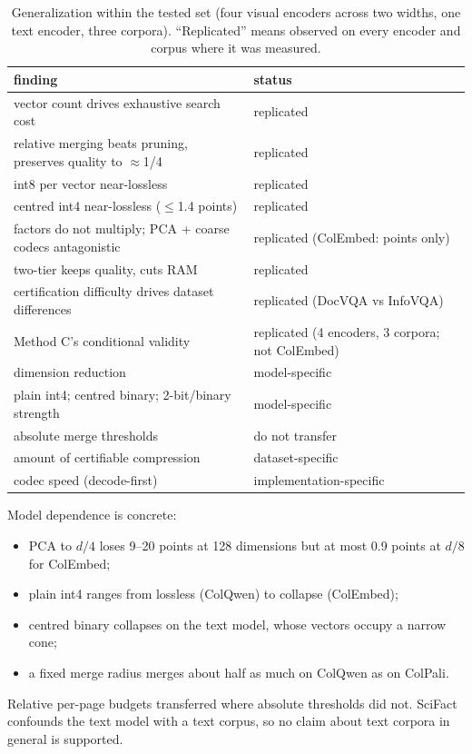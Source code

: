 \documentclass[conference]{IEEEtran}
\begin{document}
\begin{table}[t]
\centering
\caption{Generalization within the tested set (four visual encoders across two widths,
one text encoder, three corpora). ``Replicated'' means observed on every encoder and
corpus where it was measured.}
\label{tab:general}
\setlength{\tabcolsep}{3pt}
\begin{tabular}{p{}p{}}
\toprule
finding & status \\
\midrule
vector count drives exhaustive search cost & replicated \\
relative merging beats pruning, preserves quality to $\approx$1/4 & replicated \\
int8 per vector near-lossless & replicated \\
centred int4 near-lossless ($\le$1.4 points) & replicated \\
factors do not multiply; PCA + coarse codecs antagonistic & replicated (ColEmbed: points only) \\
two-tier keeps quality, cuts RAM & replicated \\
certification difficulty drives dataset differences & replicated (DocVQA vs InfoVQA) \\
Method C's conditional validity & replicated (4 encoders, 3 corpora; not ColEmbed) \\
\midrule
dimension reduction & model-specific \\
plain int4; centred binary; 2-bit/binary strength & model-specific \\
absolute merge thresholds & do not transfer \\
amount of certifiable compression & dataset-specific \\
codec speed (decode-first) & implementation-specific \\
\bottomrule
\end{tabular}
\end{table}

Model dependence is concrete:
\begin{itemize}
\item PCA to $d/4$ loses 9--20 points at 128 dimensions but at most 0.9 points at
$d/8$ for ColEmbed;
\item plain int4 ranges from lossless (ColQwen) to collapse (ColEmbed);
\item centred binary collapses on the text model, whose vectors occupy a narrow cone;
\item a fixed merge radius merges about half as much on ColQwen as on ColPali.
\end{itemize}
Relative per-page budgets transferred where absolute thresholds did not. SciFact
confounds the text model with a text corpus, so no claim about text corpora in general
is supported.
\end{document}
